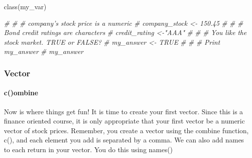 \documentclass[]{article}
\newenvironment{Shaded}{\begin{snugshade}}{\end{snugshade}}
\newcommand{\CommentTok}[1]{\textcolor[rgb]{0.56,0.35,0.01}{\textit{#1}}}
\let\oldparagraph\paragraph
\renewcommand{\paragraph}[1]{\oldparagraph{#1}\mbox{}}
\begin{document}
class(my\_var)

\begin{Shaded}
\begin{Highlighting}[]
\CommentTok{# }
\CommentTok{# # company's stock price is a numeric}
\CommentTok{# company_stock <- 150.45}
\CommentTok{# }
\CommentTok{# # Bond credit ratings are characters}
\CommentTok{# credit_rating <-"AAA"}
\CommentTok{# }
\CommentTok{# # You like the stock market. TRUE or FALSE?}
\CommentTok{# my_answer <- TRUE}
\CommentTok{# }
\CommentTok{# # Print my_answer}
\CommentTok{# my_answer}
\end{Highlighting}
\end{Shaded}

\subsubsection{Vector}\label{vector}

\paragraph{c()ombine}\label{combine}

Now is where things get fun! It is time to create your first vector.
Since this is a finance oriented course, it is only appropriate that
your first vector be a numeric vector of stock prices. Remember, you
create a vector using the combine function, c(), and each element you
add is separated by a comma. We can also add names to each return in
your vector. You do this using names()
\end{document}
